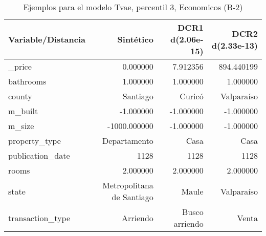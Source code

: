 \begin{table}[H]
\centering
\fontsize{10}{14}\selectfont
\caption{Ejemplos para el modelo Tvae, percentil 3, Economicos (B-2)}
\label{table-example-economicos-b-2-tvae-3p}
\begin{tabular}{|l|r|r|r|}
\hline
\rowcolor[gray]{0.8}
Variable/Distancia & Sintético & DCR1 d(2.06e-15) & DCR2 d(2.33e-13) \\
\hline \_price & \cellcolor[rgb]{0.9, 0.54, 0.52} 0.000000 & 7.912356 & 894.440199 \\
\hline bathrooms & \cellcolor[rgb]{0.9, 0.54, 0.52} 1.000000 & \cellcolor[rgb]{0.9, 0.54, 0.52} 1.000000 & \cellcolor[rgb]{0.9, 0.54, 0.52} 1.000000 \\
\hline county & \cellcolor[rgb]{0.9, 0.54, 0.52} Santiago & Curicó & Valparaíso \\
\hline m\_built & \cellcolor[rgb]{0.9, 0.54, 0.52} -1.000000 & \cellcolor[rgb]{0.9, 0.54, 0.52} -1.000000 & \cellcolor[rgb]{0.9, 0.54, 0.52} -1.000000 \\
\hline m\_size & \cellcolor[rgb]{0.9, 0.54, 0.52} -1000.000000 & \cellcolor[rgb]{0.9, 0.54, 0.52} -1.000000 & \cellcolor[rgb]{0.9, 0.54, 0.52} -1.000000 \\
\hline property\_type & \cellcolor[rgb]{0.9, 0.54, 0.52} Departamento & Casa & Casa \\
\hline publication\_date & \cellcolor[rgb]{0.9, 0.54, 0.52} 1128 & \cellcolor[rgb]{0.9, 0.54, 0.52} 1128 & \cellcolor[rgb]{0.9, 0.54, 0.52} 1128 \\
\hline rooms & \cellcolor[rgb]{0.9, 0.54, 0.52} 2.000000 & \cellcolor[rgb]{0.9, 0.54, 0.52} 2.000000 & \cellcolor[rgb]{0.9, 0.54, 0.52} 2.000000 \\
\hline state & \cellcolor[rgb]{0.9, 0.54, 0.52} Metropolitana de Santiago & Maule & Valparaíso \\
\hline transaction\_type & \cellcolor[rgb]{0.9, 0.54, 0.52} Arriendo & Busco arriendo & Venta \\
\hline
\end{tabular}
\end{table}
